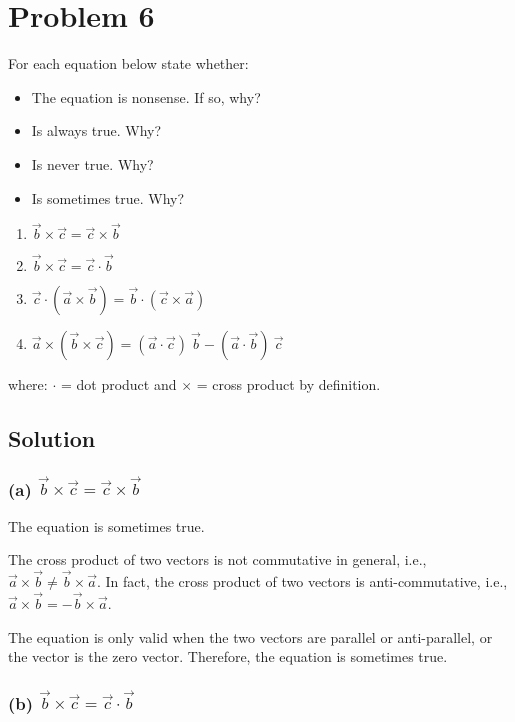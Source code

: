 \section*{Problem 6}

For each equation below state whether:
\begin{itemize}
    \item The equation is nonsense. If so, why?
    \item Is always true. Why?
    \item Is never true. Why?
    \item Is sometimes true. Why?
\end{itemize}

\begin{enumerate}[label = (\alph*)]
    \item \( \vec{b} \times \vec{c} = \vec{c} \times \vec{b} \)
    \item \( \vec{b} \times \vec{c} = \vec{c} \cdot \vec{b} \)
    \item \( \vec{c} \cdot (\vec{a} \times \vec{b}) = \vec{b} \cdot (\vec{c} \times \vec{a}) \)
    \item \( \vec{a} \times (\vec{b} \times \vec{c}) = (\vec{a} \cdot \vec{c})\ \vec{b} - (\vec{a} \cdot \vec{b})\ \vec{c} \)
\end{enumerate}
where: \( \cdot \) = dot product and \( \times \) = cross product by definition.

\subsection*{Solution}

\subsubsection*{(a) \( \vec{b} \times \vec{c} = \vec{c} \times \vec{b} \)}

The equation is sometimes true.

The cross product of two vectors is not commutative in general, i.e., \( \vec{a} \times \vec{b} \neq \vec{b} \times \vec{a} \).
In fact, the cross product of two vectors is anti-commutative, i.e., \( \vec{a} \times \vec{b} = -\vec{b} \times \vec{a} \).

The equation is only valid when the two vectors are parallel or anti-parallel, or the vector is the zero vector.
Therefore, the equation is sometimes true.

\subsubsection*{(b) \( \vec{b} \times \vec{c} = \vec{c} \cdot \vec{b} \)}

